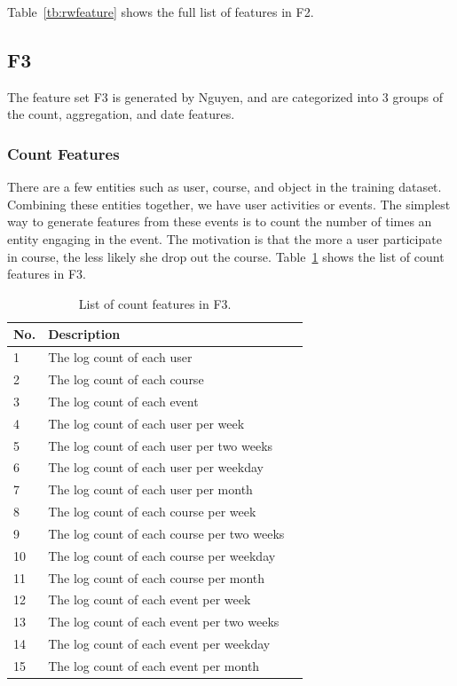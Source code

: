 Table~\ref{tb:rwfeature} shows the full list of features in F2.

\subsection{F3}
The feature set F3 is generated by Nguyen, and are categorized into 3 groups of the count, aggregation, and date features.

\subsubsection{Count Features}
There are a few entities such as user, course, and object in the training dataset.  Combining these entities together, we have user activities or events.  The simplest way to generate features from these events is to count the number of times an entity engaging in the event. The motivation is that the more a user participate in course, the less likely she drop out the course. Table~\ref{tb:tnfeature1} shows the list of count features in F3. 

\begin{center}
	\begin{table}[ht]
		\begin{minipage}{0.5 \textwidth}
			{
				\caption{List of count features in F3.}
				\small
				\hfill{}
				\begin{tabular}{|l|l|l|}
					\hline
					\textbf{No.}	&\textbf{Description}\tabularnewline \hline
					1 			& The log count of each user \tabularnewline
					2 			& The log count of each course \tabularnewline
					3			& The log count of each event \tabularnewline
					4 			& The log count of each user per week \tabularnewline
					5 			& The log count of each user per two weeks \tabularnewline
					6 			& The log count of each user per weekday \tabularnewline
					7 			& The log count of each user per month\tabularnewline
					8 			& The log count of each course per week \tabularnewline
					9 			& The log count of each course per two weeks \tabularnewline
					10 			& The log count of each course per weekday\tabularnewline
					11 			& The log count of each course per month \tabularnewline
					12 			& The log count of each event per week \tabularnewline
					13 			& The log count of each event per two weeks \tabularnewline
					14 			& The log count of each event per weekday \tabularnewline
					15 			& The log count of each event per month \tabularnewline
					\hline
				\end{tabular}
			}
			\hfill{}
			\label{tb:tnfeature1}
		\end{minipage}
	\end{table}
\end{center}

